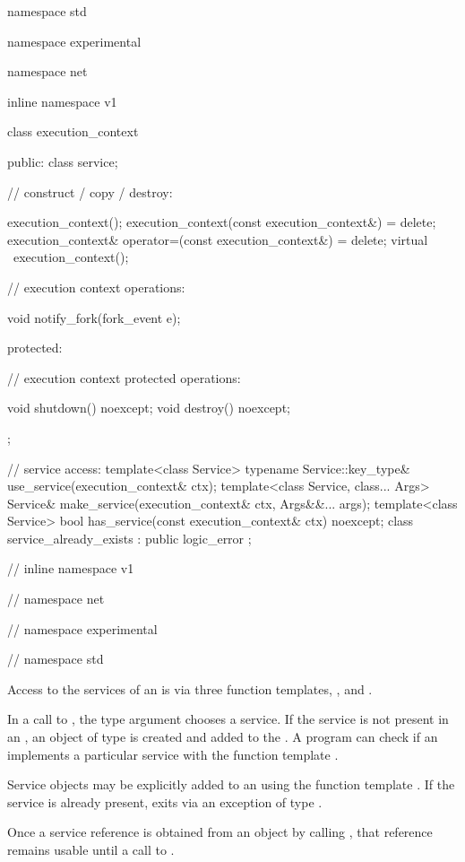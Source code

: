 \begin{codeblock}
namespace std {
namespace experimental {
namespace net {
inline namespace v1 {

  class execution_context
  {
  public:
    class service;

    // construct / copy / destroy:

    execution_context();
    execution_context(const execution_context&) = delete;
    execution_context& operator=(const execution_context&) = delete;
    virtual ~execution_context();

    // execution context operations:

    void notify_fork(fork_event e);

  protected:

    // execution context protected operations:

    void shutdown() noexcept;
    void destroy() noexcept;
  };

  // service access:
  template<class Service> typename Service::key_type&
    use_service(execution_context& ctx);
  template<class Service, class... Args> Service&
    make_service(execution_context& ctx, Args&&... args);
  template<class Service> bool has_service(const execution_context& ctx) noexcept;
  class service_already_exists : public logic_error { };

} // inline namespace v1
} // namespace net
} // namespace experimental
} // namespace std
\end{codeblock}

\pnum
Access to the services of an  is via three function templates, ,  and .

\pnum
In a call to , the type argument chooses a service. If the service is not present in an , an object of type  is created and added to the . A program can check if an  implements a particular service with the function template .

\pnum
Service objects may be explicitly added to an  using the function template . If the service is already present,  exits via an exception of type .

\pnum
Once a service reference is obtained from an  object by calling , that reference remains usable until a call to .


